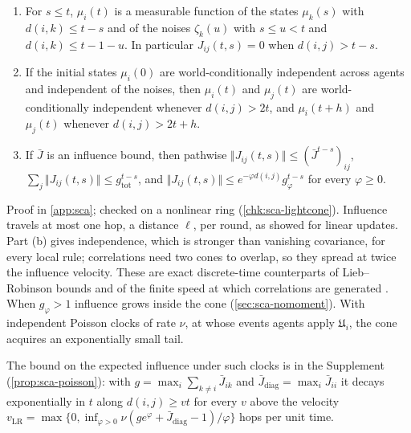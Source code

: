 \begin{theorem}\label{thm:sca-lightcone}
\begin{enumerate}
\item[(a)] For $s\le t$, $\mu_i(t)$ is a measurable function of the states $\mu_k(s)$ with $d(i,k)\le t-s$ and of the noises $\zeta_k(u)$ with $s\le u<t$ and $d(i,k)\le t-1-u$. In particular $J_{ij}(t,s)=0$ when $d(i,j)>t-s$.
\item[(b)] If the initial states $\mu_i(0)$ are world-conditionally independent across agents and independent of the noises, then $\mu_i(t)$ and $\mu_j(t)$ are world-conditionally independent whenever $d(i,j)>2t$, and $\mu_i(t+h)$ and $\mu_j(t)$ whenever $d(i,j)>2t+h$.
\item[(c)] If $\bar J$ is an influence bound, then pathwise $\Vert J_{ij}(t,s)\Vert\le(\bar J^{t-s})_{ij}$, $\sum_j\Vert J_{ij}(t,s)\Vert\le g_{\mathrm{tot}}^{t-s}$, and $\Vert J_{ij}(t,s)\Vert\le e^{-\varphi d(i,j)}g_\varphi^{t-s}$ for every $\varphi\ge0$.
\end{enumerate}
\end{theorem}
Proof in \cref{app:sca}; checked on a nonlinear ring (\cref{chk:sca-lightcone}). Influence travels at most one hop, a distance $\ell$, per round, as \citet{dennis2026communicating} showed for linear updates. Part (b) gives independence, which is stronger than vanishing covariance, for every local rule; correlations need two cones to overlap, so they spread at twice the influence velocity. These are exact discrete-time counterparts of Lieb--Robinson bounds \citep{lieb1972finite,marchioro1978velocity,raz2009estimating} and of the finite speed at which correlations are generated \citep{bravyi2006lieb}. When $g_\varphi>1$ influence grows inside the cone (\cref{sec:sca-nomoment}). With independent Poisson clocks of rate $\nu$, at whose events agents apply $\mathfrak U_i$, the cone acquires an exponentially small tail.

The bound on the expected influence under such clocks is in the Supplement (\cref{prop:sca-poisson}): with $g=\max_i\sum_{k\neq i}\bar J_{ik}$ and $\bar J_{\mathrm{diag}}=\max_i\bar J_{ii}$ it decays exponentially in $t$ along $d(i,j)\ge vt$ for every $v$ above the velocity $v_{\mathrm{LR}}=\max\bigl\{0,\inf_{\varphi>0}\nu(ge^\varphi+\bar J_{\mathrm{diag}}-1)/\varphi\bigr\}$ hops per unit time.

